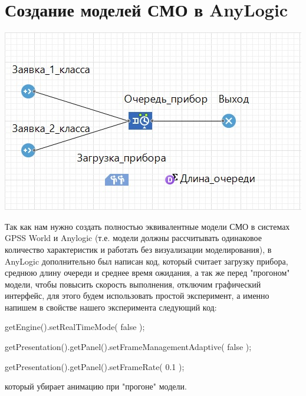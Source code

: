 \documentclass[a4paper,14pt]{report} %
\begin{document}
\section{Создание моделей СМО в AnyLogic}
\includegraphics[width=0.5\linewidth]{model_AnyLogic}

Так как нам нужно создать полностью эквивалентные модели СМО в системах GPSS World и Anylogic (т.е. модели должны рассчитывать одинаковое количество характеристик и работать без визуализации моделирования), в AnyLogic дополнительно был написан код, который считает загрузку прибора, среднюю длину очереди и среднее время ожидания, а так же перед "прогоном" модели, чтобы повысить скорость выполнения, отключим графический интерфейс, для этого будем использовать простой эксперимент, а именно напишем в свойстве нашего эксперимента следующий код:\par
getEngine().setRealTimeMode( false );\par
getPresentation().getPanel().setFrameManagementAdaptive( false );\par
getPresentation().getPanel().setFrameRate( 0.1 );\par\noindent
который убирает анимацию при "прогоне" модели.
\end{document}
